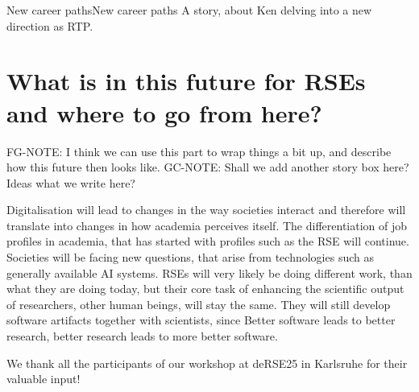 \documentclass{eceasst}
\begin{document}
\begin{story}{New career paths}{New career paths}
A story, about Ken delving into a new direction as RTP.
\end{story}

\section{What is in this future for RSEs and where to go from here?}
FG-NOTE: I think we can use this part to wrap things a bit up, and describe how this future then looks like.
GC-NOTE: Shall we add another story box here? Ideas what we write here?

Digitalisation will lead to changes in the way societies interact and therefore will translate
into changes in how academia perceives itself. The differentiation of job profiles in academia,
that has started with profiles such as the RSE will continue. Societies will be facing new questions, that arise
from technologies such as generally available AI systems. RSEs will very likely be doing different work,
than what they are doing today, but their core task of enhancing the scientific output of researchers, other human
beings, will stay the same.
They will still develop software artifacts together with scientists,
since Better software leads to better research,
better research leads to more better software.

\begin{acknowledge}
We thank all the participants of our workshop at deRSE25 in Karlsruhe for their valuable input!
\end{acknowledge}



\end{document}
